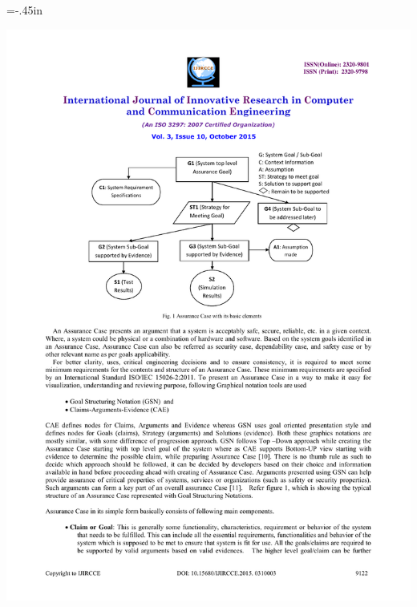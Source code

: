 \documentclass[t,12pt,numbers,fleqn]{beamer}
\begin{document}
\hoffset=-.45in
\begin{frame}[plain]

\includegraphics[width=1.19\textwidth]{../Figures/assuranceBasic.pdf}

\end{frame}
\hoffset=0in

\end{document}
